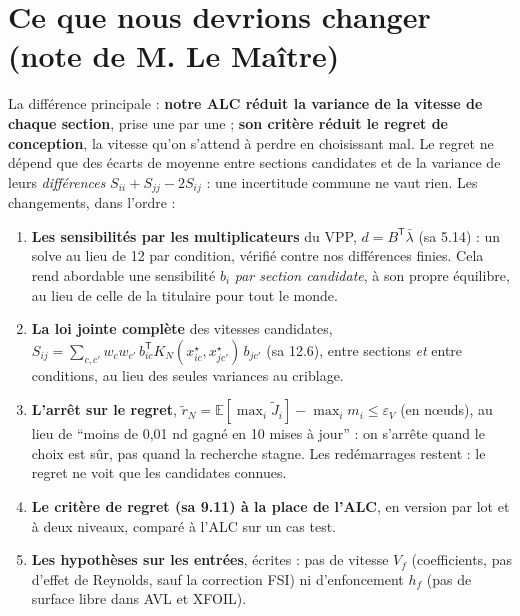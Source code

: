 \documentclass[11pt,a4paper]{article}
\newcommand{\tp}{^{\mathsf{T}}}
\begin{document}
\section{Ce que nous devrions changer (note de M. Le Maître)}
La différence principale : \textbf{notre ALC réduit la variance de la vitesse de chaque section}, prise une
par une ; \textbf{son critère réduit le regret de conception}, la vitesse qu'on s'attend à perdre en
choisissant mal. Le regret ne dépend que des écarts de moyenne entre sections candidates et de la variance de
leurs \emph{différences} $S_{ii}+S_{jj}-2S_{ij}$ : une incertitude commune ne vaut rien. Les changements, dans
l'ordre :
\begin{enumerate}
  \item \textbf{Les sensibilités par les multiplicateurs} du VPP, $d=B\tp\bar\lambda$ (sa 5.14) : un solve au
        lieu de 12 par condition, vérifié contre nos différences finies. Cela rend abordable une sensibilité
        $b_i$ \emph{par section candidate}, à son propre équilibre, au lieu de celle de la titulaire pour tout
        le monde.
  \item \textbf{La loi jointe complète} des vitesses candidates, $S_{ij}=\sum_{c,c'}w_cw_{c'}\,b_{ic}\tp
        K_N(x^\star_{ic},x^\star_{jc'})\,b_{jc'}$ (sa 12.6), entre sections \emph{et} entre conditions, au lieu des
        seules variances au criblage.
  \item \textbf{L'arrêt sur le regret}, $\tilde r_N=\mathbb E[\max_i\tilde J_i]-\max_i m_i\le\varepsilon_V$ (en
        nœuds), au lieu de \enquote{moins de 0,01 nd gagné en 10 mises à jour} : on s'arrête quand le choix est
        sûr, pas quand la recherche stagne. Les redémarrages restent : le regret ne voit que les candidates
        connues.
  \item \textbf{Le critère de regret (sa 9.11) à la place de l'ALC}, en version par lot et à deux niveaux,
        comparé à l'ALC sur un cas test.
  \item \textbf{Les hypothèses sur les entrées}, écrites : pas de vitesse $V_f$ (coefficients, pas d'effet de
        Reynolds, sauf la correction FSI) ni d'enfoncement $h_f$ (pas de surface libre dans AVL et XFOIL).
\end{enumerate}

\end{document}
